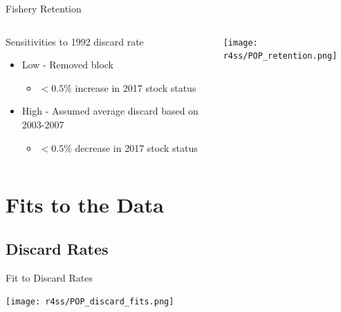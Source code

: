 \documentclass[pdf]{beamer}\usepackage[]{graphicx}\usepackage[]{color}
\begin{document}
\begin{frame}{Fishery Retention}
\begin{columns}
  \begin{column}{0.4\textwidth}
      Sensitivities to 1992 discard rate
      \begin{itemize}
        \item Low - Removed block  
          \begin{itemize}
            \item $< 0.5\%$ increase in 2017 stock status
          \end{itemize}
        \item High - Assumed average discard based on 2003-2007 
          \begin{itemize}
            \item $< 0.5\%$ decrease in 2017 stock status
          \end{itemize}
      \end{itemize}
  \end{column}
  
  \begin{column}{0.6\textwidth}
  \begin{center}
    \texttt{[image: r4ss/POP\_retention.png]}
  \end{center}
  \end{column}
\end{columns}
\end{frame}



\section{Fits to the Data}
\subsection{Discard Rates}
\begin{frame}{Fit to Discard Rates}
  \begin{center}
    \texttt{[image: r4ss/POP\_discard\_fits.png]}
  \end{center}
\end{frame}
\end{document}
